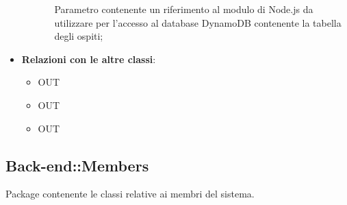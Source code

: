 \begin{itemize}
\begin{itemize}
\begin{itemize}
			Parametro contenente un riferimento al modulo di Node.js da utilizzare per l'accesso al database DynamoDB contenente la tabella degli ospiti;
		\end{itemize}
	\end{itemize}
	\item \textbf{Relazioni con le altre classi}:
	\begin{itemize}
		\item OUT \hyperlink{Guest_label}{}
		\item OUT \hyperlink{GuestObservable_label}{}
		\item OUT \hyperlink{ErrorObservable_label}{}
	\end{itemize}
\end{itemize}
\FloatBarrier

\subsection{Back-end::Members}
Package contenente le classi relative ai membri del sistema.
